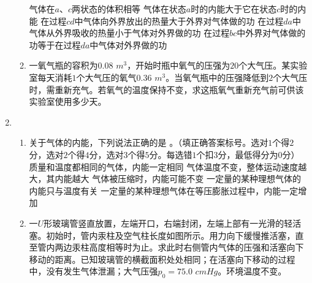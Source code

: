 \begin{enumerate}[leftmargin=0em]
\begin{enumerate}
\fivechoices
{气体在$ a $、$ c $两状态的体积相等}
{气体在状态$ a $时的内能大于它在状态$ c $时的内能}
{在过程$ cd $中气体向外界放出的热量大于外界对气体做的功}
{在过程$ da $中气体从外界吸收的热量小于气体对外界做的功}
{在过程$ bc $中外界对气体做的功等于在过程$ da $中气体对外界做的功}



\item 
一氧气瓶的容积为$ 0.08 $ $ m^{3} $，开始时瓶中氧气的压强为$ 20 $个大气压。某实验室每天消耗$ 1 $个大气压的氧气$ 0.36 $ $ m^{3} $。当氧气瓶中的压强降低到$ 2 $个大气压时，需重新充气。若氧气的温度保持不变，求这瓶氧气重新充气前可供该实验室使用多少天。






\end{enumerate}


\newpage
\item 
{}
\begin{enumerate}
\renewcommand{\labelenumi}{\arabic{enumi}.}
\item
关于气体的内能，下列说法正确的是  
。（填正确答案标号。选对$ 1 $个得$ 2 $分，选对$ 2 $个得$ 4 $分，选对$ 3 $个得$ 5 $分。每选错$ 1 $个扣$ 3 $分，最低得分为$ 0 $分）
\fivechoices
{质量和温度都相同的气体，内能一定相同}
{气体温度不变，整体运动速度越大，其内能越大}
{气体被压缩时，内能可能不变}
{一定量的某种理想气体的内能只与温度有关}
{一定量的某种理想气体在等压膨胀过程中，内能一定增加}




\item 
一$ U $形玻璃管竖直放置，左端开口，右端封闭，左端上部有一光滑的轻活塞。初始时，管内汞柱及空气柱长度如图所示。用力向下缓慢推活塞，直至管内两边汞柱高度相等时为止。求此时右侧管内气体的压强和活塞向下移动的距离。已知玻璃管的横截面积处处相同；在活塞向下移动的过程中，没有发生气体泄漏；大气压强$ p_0=75.0 $ $ cmHg $。环境温度不变。
\begin{figure}[h!]
\centering

\end{figure}






\end{enumerate}
\end{enumerate}
